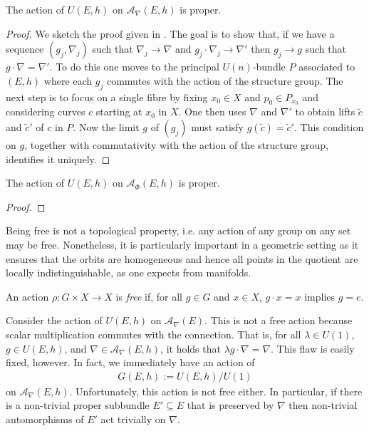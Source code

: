 \documentclass[12pt]{ociamthesis}  %
\begin{document}
\begin{example}\label{ex:h_proper_action}
  The action of $U(E,h)$ on $\mathcal A_\nabla(E,h)$ is proper.
  \begin{proof}
    We sketch the proof given in
    \cite[{Proposition 7.1.14}]{kobayashi1987}.
    The goal is to show that, if we have a sequence $(g_j,\nabla_j)$
    such that $\nabla_j\to\nabla$ and $g_j\cdot\nabla_j\to\nabla'$
    then $g_j\to g$ such that $g\cdot\nabla = \nabla'$. To do this
    one moves to the principal $U(n)$-bundle $P$ associated to $(E,h)$
    where each $g_j$ commutes with the action of the structure
    group. The next step is to focus on a single fibre by fixing $x_0\in X$ and
    $p_0\in P_{x_0}$ and considering curves $c$ starting at $x_0$ in $X$.
    One then uses $\nabla$ and $\nabla'$ to obtain lifts $\tilde c$ and
    $\tilde c'$ of $c$ in $P$. Now the limit $g$ of $(g_j)$ must satisfy
    $g(\tilde c) = \tilde c'$. This condition on $g$, together with
    commutativity with the action of the structure group, identifies it
    uniquely.
  \end{proof}
\end{example}

\begin{example}\label{ex:higgs_proper_action}
  The action of $U(E,h)$ on $\mathcal A_\Phi (E,h)$ is proper.
  \begin{proof}
    \missingproof
  \end{proof}
\end{example}

Being free is not a topological property, i.e. any action of any group on any
set may be free. Nonetheless, it is particularly important in a geometric
setting as it ensures that the orbits are homogeneous and hence all points in
the quotient are locally indistinguishable, as one expects from manifolds.

\begin{definition}
  An action $\rho : G\times X\to X$ is \emph{free} if, for all
  $g\in G$ and $x\in X$, $g\cdot x = x$ implies $g = e$.
\end{definition}

\begin{example}\label{ex:not_free}
  Consider the action of $U(E,h)$ on $\mathcal A_\nabla(E)$. This is not a free action
  because scalar multiplication commutes with the connection. That is,
  for all $\lambda\in U(1)$, $g\in U(E,h)$, and $\nabla\in \mathcal A_\nabla(E,h)$,
  it holds that $\lambda g\cdot \nabla = \nabla$. This flaw is easily fixed,
  however. In fact, we immediately have an action of
  \begin{align*}
    G(E,h) := U(E,h) / U(1)
  \end{align*}
  on $\mathcal A_\nabla(E,h)$. Unfortunately, this action is not free either. In particular,
  if there is a non-trivial proper subbundle $E'\subseteq E$ that is preserved
  by $\nabla$ then non-trivial automorphisms of $E'$ act trivially on $\nabla$.
\end{example}
\end{document}
